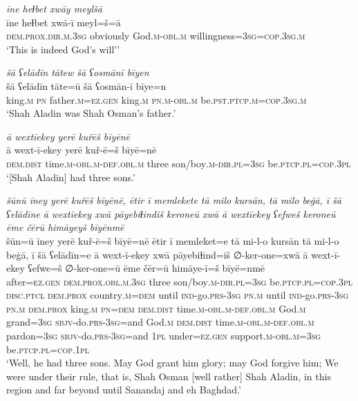 \ea \label{PM.52}
\textit{īne heɫbet xwāy meylšā} \\ 
\gll īne heɫbet xwā-ī meyl=š=ā \\ 
 \textsc{dem.prox}\textsc{.dir}\textsc{.m}\textsc{.3sg} obviously God\textsc{.m}\textsc{-obl}\textsc{.m} willingness\textsc{=3sg}\textsc{=cop}\textsc{.3sg}\textsc{.m} \\ 
\glt `This is indeed God’s will’'
\z 
 
\ea \label{DG.2}
\textit{šā ʕelādīn tātew šā ʕosmānī bīyen} \\ 
\gll šā ʕelādīn tāte=ū šā ʕosmān-ī bīye=n \\ 
 king\textsc{.m} \textsc{pn} father\textsc{.m}\textsc{=ez}\textsc{.gen} king\textsc{.m} \textsc{pn}\textsc{.m}\textsc{-obl}\textsc{.m} be\textsc{.pst}\textsc{.ptcp}\textsc{.m}\textsc{=cop}\textsc{.3sg}\textsc{.m} \\ 
\glt `Shah Aladin was Shah Osman’s father.'
\z 
 
\ea \label{DG.3}
\textit{ā wextīekey yerē kuřēš bīyēnē} \\ 
\gll ā wext-ī-ekey yerē kuř-ē=š bīyē=nē \\ 
 \textsc{dem.dist} time\textsc{.m}\textsc{-obl}\textsc{.m}\textsc{-def}\textsc{.obl}\textsc{.m} three son/boy\textsc{.m}\textsc{-dir}\textsc{.pl}\textsc{=3sg} be\textsc{.ptcp}\textsc{.pl}\textsc{=cop}\textsc{.3pl} \\ 
\glt `[Shah Aladin] had three sons.'
\z 
 
\ea \label{DG.4}
\textit{šūnū īney yerē kuřēš bīyēnē, ētir ī memlekete tā milo kursān, tā milo beġā, ī šā ʕelādīne ā wextīekey xwā pāyebiɫindiš keroneū xwā ā wextīekey ʕefweš keroneū ēme čērū himāyeyš bīyēnmē} \\ 
\gll šūn=ū īney yerē kuř-ē=š bīyē=nē ētir ī memleket=e tā mi-l-o kursān tā mi-l-o beġā, ī šā ʕelādīn=e ā wext-ī-ekey xwā pāyebiɫind=iš ∅-ker-one=xwā ā wext-ī-ekey ʕefwe=š ∅-ker-one=ū ēme čēr=ū himāye-ī=š bīyē=nmē \\ 
 after\textsc{=ez}\textsc{.gen} \textsc{dem.prox}\textsc{.obl}\textsc{.m}\textsc{.3sg} three son/boy\textsc{.m}\textsc{-dir}\textsc{.pl}\textsc{=3sg} be\textsc{.ptcp}\textsc{.pl}\textsc{=cop}\textsc{.3pl} \textsc{disc.ptcl} \textsc{dem.prox} country\textsc{.m}\textsc{=dem} until \textsc{ind-}go\textsc{.prs}\textsc{-3sg} \textsc{pn}\textsc{.m} until \textsc{ind-}go\textsc{.prs}\textsc{-3sg} \textsc{pn}\textsc{.m} \textsc{dem.prox} king\textsc{.m} \textsc{pn}\textsc{=dem} \textsc{dem.dist} time\textsc{.m}\textsc{-obl}\textsc{.m}\textsc{-def}\textsc{.obl}\textsc{.m} God\textsc{.m} grand\textsc{=3sg} \textsc{sbjv-}do\textsc{.prs}\textsc{-3sg}=and God\textsc{.m} \textsc{dem.dist} time\textsc{.m}\textsc{-obl}\textsc{.m}\textsc{-def}\textsc{.obl}\textsc{.m} pardon\textsc{=3sg} \textsc{sbjv-}do\textsc{.prs}\textsc{-3sg}=and \textsc{1pl} under\textsc{=ez}\textsc{.gen} support\textsc{.m}\textsc{-obl}\textsc{.m}\textsc{=3sg} be\textsc{.ptcp}\textsc{.pl}\textsc{=cop}\textsc{.1pl} \\ 
\glt `Well, he had three sons. May God grant him glory; may God forgive him; We were under their rule, that is, Shah Osman [well rather] Shah Aladin, in this region and far beyond until Sanandaj and eh Baghdad.'
\z 
 
